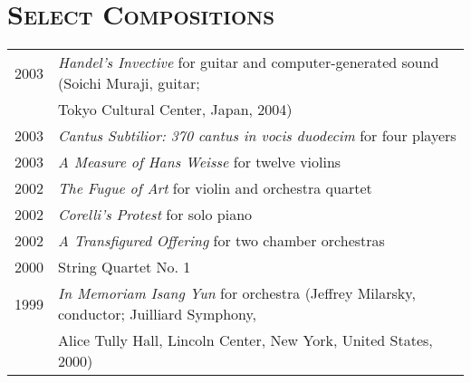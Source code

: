 \documentclass[a4paper,11pt]{article}
\begin{document}
%  
%  
%  
%  
%  
%  
%  
%  
  
  \section*{\textsc{Select Compositions}}
  
  \hspace*{-0.25cm}
  \begin{tabular}{p{2.5cm} p{12.5cm}}
  2003 & \textit{Handel’s Invective} for guitar and computer-generated sound (Soichi Muraji, guitar;\\
  & Tokyo Cultural Center, Japan, 2004)\\[2mm]
  
  2003 & \textit{Cantus Subtilior: 370 cantus in vocis duodecim} for four players\\[2mm]
  
  2003 & \textit{A Measure of Hans Weisse} for twelve violins\\[2mm]
  
  2002 & \textit{The Fugue of Art} for violin and orchestra quartet\\[2mm]
  
  2002 & \textit{Corelli’s Protest} for solo piano\\[2mm]
  
  2002 & \textit{A Transfigured Offering} for two chamber orchestras\\[2mm]
  
  2000 & String Quartet No. 1\\[2mm]
  
  1999 & \textit{In Memoriam Isang Yun} for orchestra (Jeffrey Milarsky, conductor; Juilliard Symphony,\\
  & Alice Tully Hall, Lincoln Center, New York, United States, 2000)
  \end{tabular}
  
\end{document}
